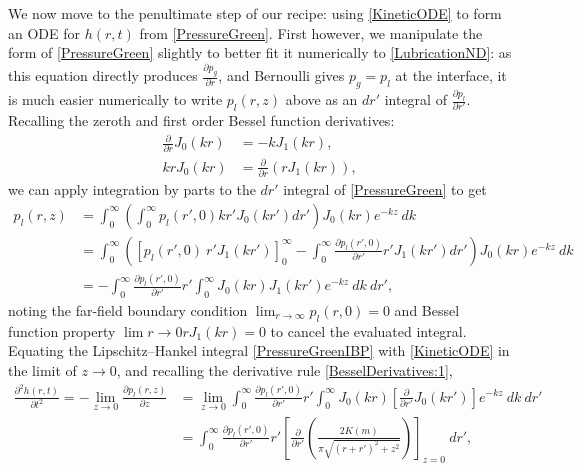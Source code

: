 \documentclass[11pt,a4paper]{article}
\begin{document}
	We now move to the penultimate step of our recipe: using \eqref{KineticODE} to form an ODE for $h(r,t)$ from \eqref{PressureGreen}. First however, we manipulate the form of \eqref{PressureGreen} slightly to better fit it numerically to \eqref{LubricationND}: as this equation directly produces $\frac{\partial p_g}{\partial r}$, and Bernoulli gives $p_g = p_l$ at the interface, it is much easier numerically to write $p_l(r, z)$ above as an $dr'$ integral of $\frac{\partial p_l}{\partial r'}$. Recalling the zeroth and first order Bessel function derivatives: 
	\begin{subequations}
		\label{BesselDerivatives}
		\begin{align}
			\frac{\partial }{\partial r} J_0(kr) &= -kJ_1(kr), \label{BesselDerivatives:1} \\
			krJ_0(kr) &= \frac{\partial }{\partial r} (rJ_1(kr)), \label{BesselDerivatives:2}
		\end{align}
	\end{subequations}
	we can apply integration by parts to the $dr'$ integral of \eqref{PressureGreen} to get
	\begin{equation}
		\label{PressureGreenIBP}
		\begin{aligned}
			p_l(r, z) &= \int^\infty _0 \left( \int^\infty _0 p_l(r',0) kr'J_0(kr') dr' \right) J_0(kr) e^{-kz} \ dk \\
			&= \int^\infty _0 \left( \left[ p_l(r',0)\ r'J_1(kr') \right]^\infty _0 - \int^\infty _0 \frac{\partial p_l(r',0)}{\partial r'} r'J_1(kr') dr' \right) J_0(kr) e^{-kz} \ dk \\
			&= -\int^\infty _0 \frac{\partial p_l(r',0)}{\partial r'} r' \int^\infty _0 J_0(kr)J_1(kr')e^{-kz}\ dk\ dr',
		\end{aligned}
	\end{equation}
	noting the far-field boundary condition $\lim_{r \to \infty }p_l(r ,0) = 0$ and Bessel function property $\lim{r \to 0}rJ_1(kr) = 0$  to cancel the evaluated integral. Equating the Lipschitz–Hankel integral \eqref{PressureGreenIBP} with \eqref{KineticODE} in the limit of $z \to 0$, and recalling the derivative rule \eqref{BesselDerivatives:1}, 
	\begin{equation}
		\label{BoundaryIntegralAntiderivative}
		\begin{aligned}
			\frac{\partial^2 h(r, t)}{\partial t^2} = -\lim_{z \to 0} \frac{\partial p_l(r,z)}{\partial z} &= \lim_{z \to 0} \int^\infty _0 \frac{\partial p_l(r',0)}{\partial r'} r' \int^\infty _0 J_0(kr)\left[ \frac{\partial }{\partial r'}J_0(kr') \right]e^{-kz}\ dk\ dr' \\
			&= \int^\infty _0 \frac{\partial p_l(r',0)}{\partial r'} r' \left[ \frac{\partial }{\partial r'} \left( \frac{2K(m)}{\pi\sqrt{(r+r')^2 + z^2}} \right) \right]_{z=0}\ dr',
		\end{aligned}
	\end{equation}
\end{document}
